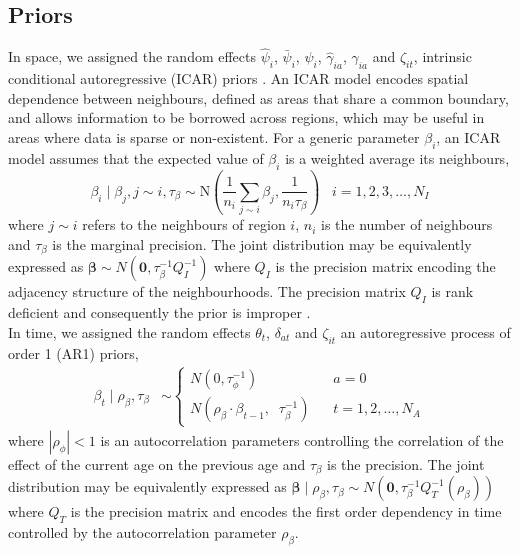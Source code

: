 \documentclass{article}
\begin{document}
\begin{appendix}

\subsection{Priors}


In space, we assigned the random effects $\hat{\psi}_i$, $\bar{\psi}_i$, $\psi_i$, $\hat{\gamma}_{ia}$, $\gamma_{ia}$ and $\zeta_{it}$, intrinsic conditional autoregressive (ICAR) priors \cite{besag1995conditional}. An ICAR model encodes spatial dependence between neighbours, defined as areas that share a common boundary, and allows information to be borrowed across regions, which may be useful in areas where data is sparse or non-existent. For a generic parameter $\beta_i$, an ICAR model assumes that the expected value of $\beta_i$ is a weighted average its neighbours, 
\begin{equation*}
	\beta_i \;|\; \beta_{j}, j \sim i, \tau_{\beta} \sim \text{N}\left(\frac{1}{n_i} \sum_{j \sim i} \beta_j, \frac{1}{n_i\tau_{\beta}} \right) \;\;\; i = 1, 2, 3,\ldots, N_I
\end{equation*}
where $j \sim i$ refers to the neighbours of region $i$, $n_i$ is the number of neighbours and $\tau_{\beta}$ is the marginal precision. The joint distribution may be equivalently expressed as $\boldsymbol{\beta} \sim N(\boldsymbol{0}, \tau_{\beta}^{-1}Q^{-1}_{I})$ where $Q_{I}$ is the precision matrix encoding the adjacency structure of the neighbourhoods. The precision matrix $Q_{I}$ is rank deficient and consequently the prior is improper \cite{rue2005gaussian}. \\

\noindent In time, we assigned the random effects $\theta_t$, $\delta_{at}$ and $\zeta_{it}$ an autoregressive process of order 1 (AR1) priors,
\begin{align*} 
  \beta_t \; | \; \rho_{\beta}, \tau_{\beta} &\sim
  \begin{cases}
  	N(0, \tau^{-1}_{\phi}) & a = 0\\
  	N(\rho_{\beta} \cdot \beta_{t-1}, \;\; \tau^{-1}_{\beta}) \;\;\; & t = 1, 2,\ldots, N_A
  \end{cases}
\end{align*}
where $|\rho_{\phi}| < 1$ is an autocorrelation parameters controlling the correlation of the effect of the current age on the previous age and $\tau_{\beta}$ is the precision. The joint distribution may be equivalently expressed as $\boldsymbol{\beta}\; | \; \rho_{\beta}, \tau_{\beta} \sim N(\boldsymbol{0}, \tau_{\beta}^{-1}Q^{-1}_{T}(\rho_{\beta}))$ where $Q_{T}$ is the precision matrix and encodes the first order dependency in time controlled by the autocorrelation parameter $\rho_{\beta}$.\\


\end{appendix}
\end{document}

